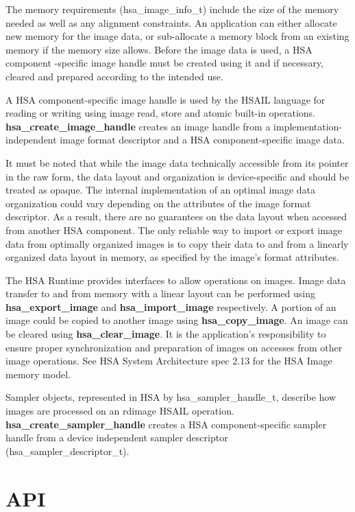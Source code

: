 \documentclass{book}
\newcommand{\reffun}[1]{\textbf{#1}}
\newcommand{\reftyp}[1]{#1}
\begin{document}
\begin{appendices}
The memory requirements (\reftyp{hsa\_image\_info\_t}) include the size of the
memory needed as well as any alignment constraints. An application can
either allocate new memory for the image data, or sub-allocate a
memory block from an existing memory if the memory size allows. Before
the image data is used, a HSA component -specific image handle must be
created using it and if necessary, cleared and prepared according to
the intended use.

A HSA component-specific image handle is used by the HSAIL language
for reading or writing using image read, store and atomic built-in
operations. \reffun{hsa\_create\_image\_handle} creates an image handle from a
implementation-independent image format descriptor and a HSA
component-specific image data.

It must be noted that while the image data technically accessible from
its pointer in the raw form, the data layout and organization is
device-specific and should be treated as opaque. The internal
implementation of an optimal image data organization could vary
depending on the attributes of the image format descriptor. As a
result, there are no guarantees on the data layout when accessed from
another HSA component. The only reliable way to import or export image
data from optimally organized images is to copy their data to and from
a linearly organized data layout in memory, as specified by the
image’s format attributes.

The HSA Runtime provides interfaces to allow operations on
images. Image data transfer to and from memory with a linear layout
can be performed using \reffun{hsa\_export\_image} and \reffun{hsa\_import\_image}
respectively. A portion of an image could be copied to another image
using \reffun{hsa\_copy\_image}. An image can be cleared using
\reffun{hsa\_clear\_image}. It is the application’s responsibility to ensure
proper synchronization and preparation of images on accesses from
other image operations. See HSA System Architecture spec 2.13 for the
HSA Image memory model.

Sampler objects, represented in HSA by \reftyp{hsa\_sampler\_handle\_t}, describe
how images are processed on an rdimage HSAIL
operation. \reffun{hsa\_create\_sampler\_handle} creates a HSA
component-specific sampler handle from a device independent sampler
descriptor (\reftyp{hsa\_sampler\_descriptor\_t}).

\newpage
\hypertarget{Images API}{\section{API} \label{images_api}}
\makeatletter{}


\end{appendices}
\end{document}
